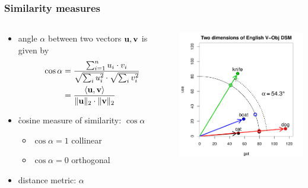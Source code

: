\documentclass[t]{beamer} %
\begin{document}
\begin{frame}
  \frametitle{Similarity measures}
  
  \begin{columns}[c]
    \begin{column}{5cm}
      \begin{itemize}
        \item angle $\alpha$ between two vectors $\vu,\vv$ is given by
          \begin{align*}
            \cos \alpha &= 
            \frac{\sum_{i=1}^n u_i\cdot v_i}{
              \sqrt{\sum_i u_i^2}\cdot \sqrt{\sum_i v_i^2}}
            \\
            &= \frac{\sprod{\vu}{\vv}}{\norm[2]{\vu}\cdot \norm[2]{\vv}}
        \end{align*}
      \item<2-> \h{cosine} measure of similarity: $\cos \alpha$
        \begin{itemize}
        \item $\cos \alpha = 1$ \so collinear
        \item $\cos \alpha = 0$ \so orthogonal
        \end{itemize}
      \item<3-> distance metric: $\alpha$
      \end{itemize}
    \end{column}
    \begin{column}{6cm}
      \includegraphics[width=6cm]{img/hieroglyph_2d_5}
    \end{column}
  \end{columns}
\end{frame}
\end{document}
